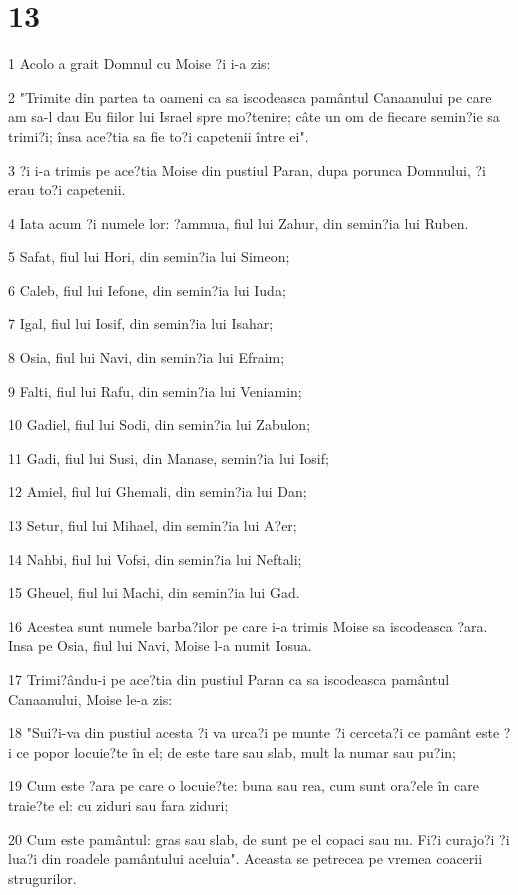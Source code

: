 \chapter{13}

\par 1 Acolo a grait Domnul cu Moise ?i i-a zis:
\par 2 "Trimite din partea ta oameni ca sa iscodeasca pamântul Canaanului pe care am sa-l dau Eu fiilor lui Israel spre mo?tenire; câte un om de fiecare semin?ie sa trimi?i; însa ace?tia sa fie to?i capetenii între ei".
\par 3 ?i i-a trimis pe ace?tia Moise din pustiul Paran, dupa porunca Domnului, ?i erau to?i capetenii.
\par 4 Iata acum ?i numele lor: ?ammua, fiul lui Zahur, din semin?ia lui Ruben.
\par 5 Safat, fiul lui Hori, din semin?ia lui Simeon;
\par 6 Caleb, fiul lui Iefone, din semin?ia lui Iuda;
\par 7 Igal, fiul lui Iosif, din semin?ia lui Isahar;
\par 8 Osia, fiul lui Navi, din semin?ia lui Efraim;
\par 9 Falti, fiul lui Rafu, din semin?ia lui Veniamin;
\par 10 Gadiel, fiul lui Sodi, din semin?ia lui Zabulon;
\par 11 Gadi, fiul lui Susi, din Manase, semin?ia lui Iosif;
\par 12 Amiel, fiul lui Ghemali, din semin?ia lui Dan;
\par 13 Setur, fiul lui Mihael, din semin?ia lui A?er;
\par 14 Nahbi, fiul lui Vofsi, din semin?ia lui Neftali;
\par 15 Gheuel, fiul lui Machi, din semin?ia lui Gad.
\par 16 Acestea sunt numele barba?ilor pe care i-a trimis Moise sa iscodeasca ?ara. Insa pe Osia, fiul lui Navi, Moise l-a numit Iosua.
\par 17 Trimi?ându-i pe ace?tia din pustiul Paran ca sa iscodeasca pamântul Canaanului, Moise le-a zis:
\par 18 "Sui?i-va din pustiul acesta ?i va urca?i pe munte ?i cerceta?i ce pamânt este ?i ce popor locuie?te în el; de este tare sau slab, mult la numar sau pu?in;
\par 19 Cum este ?ara pe care o locuie?te: buna sau rea, cum sunt ora?ele în care traie?te el: cu ziduri sau fara ziduri;
\par 20 Cum este pamântul: gras sau slab, de sunt pe el copaci sau nu. Fi?i curajo?i ?i lua?i din roadele pamântului aceluia". Aceasta se petrecea pe vremea coacerii strugurilor.
